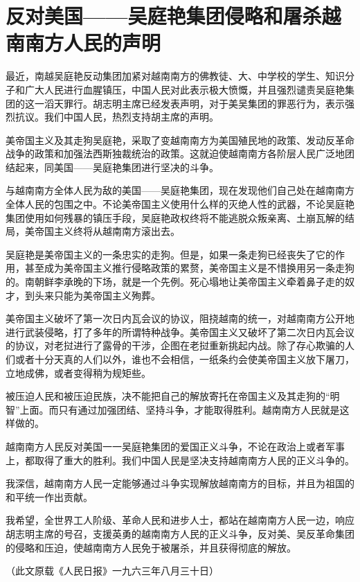 \section[反对美国——吴庭艳集团侵略和屠杀越南南方人民的声明（一九六三年八月二十九日）]{反对美国——吴庭艳集团侵略和屠杀越南南方人民的声明}


最近，南越吴庭艳反动集团加紧对越南南方的佛教徒、大、中学校的学生、知识分子和广大人民进行血腥镇压，中国人民对此表示极大愤慨，并且强烈谴责吴庭艳集团的这一滔天罪行。胡志明主席已经发表声明，对于美吴集团的罪恶行为，表示强烈抗议。我们中国人民，热烈支持胡主席的声明。

美帝国主义及其走狗吴庭艳，采取了变越南南方为美国殖民地的政策、发动反革命战争的政策和加强法西斯独裁统治的政策。这就迫使越南南方各阶层人民广泛地团结起来，同美国——吴庭艳集团进行坚决的斗争。

与越南南方全体人民为敌的美国——吴庭艳集团，现在发现他们自己处在越南南方全体人民的包围之中。不论美帝国主义使用什么样的灭绝人性的武器，不论吴庭艳集团使用如何残暴的镇压手段，吴庭艳政权终将不能逃脱众叛亲离、土崩瓦解的结局，美帝国主义终将从越南南方滚出去。

吴庭艳是美帝国主义的一条忠实的走狗。但是，如果一条走狗已经丧失了它的作用，甚至成为美帝国主义推行侵略政策的累赘，美帝国主义是不惜换用另一条走狗的。南朝鲜李承晚的下场，就是一个先例。死心塌地让美帝国主义牵着鼻子走的奴才，到头来只能为美帝国主义殉葬。

美帝国主义破坏了第一次日内瓦会议的协议，阻挠越南的统一，对越南南方公开地进行武装侵略，打了多年的所谓特种战争。美帝国主义又破坏了第二次日内瓦会议的协议，对老挝进行了露骨的干涉，企图在老挝重新挑起内战。除了存心欺骗的人们或者十分天真的人们以外，谁也不会相信，一纸条约会使美帝国主义放下屠刀，立地成佛，或者变得稍为规矩些。

被压迫人民和被压迫民族，决不能把自己的解放寄托在帝国主义及其走狗的“明智”上面。而只有通过加强团结、坚持斗争，才能取得胜利。越南南方人民就是这样做的。

越南南方人民反对美国一一吴庭艳集团的爱国正义斗争，不论在政治上或者军事上，都取得了重大的胜利。我们中国人民是坚决支持越南南方人民的正义斗争的。

我深信，越南南方人民一定能够通过斗争实现解放越南南方的目标，并且为祖国的和平统一作出贡献。

我希望，全世界工人阶级、革命人民和进步人士，都站在越南南方人民一边，响应胡志明主席的号召，支援英勇的越南南方人民的正义斗争，反对美、吴反革命集团的侵略和压迫，使越南南方人民免于被屠杀，并且获得彻底的解放。

{\raggedleft （此文原载《人民日报》一九六三年八月三十日）\par}


